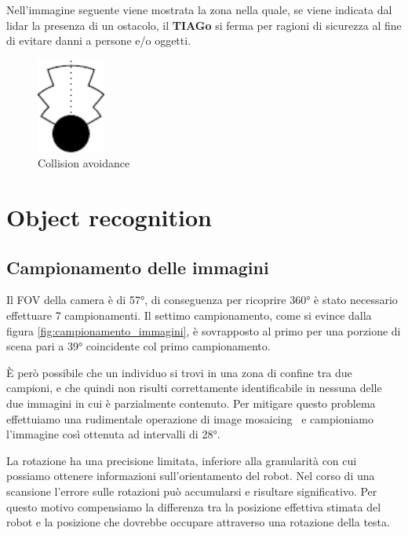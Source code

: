 \documentclass[a4paper]{article}
\begin{document}
	Nell'immagine seguente viene mostrata la zona nella quale, se viene indicata dal lidar la presenza di un ostacolo, il \textbf{TIAGo} si ferma per ragioni di sicurezza al fine di evitare danni a persone e/o oggetti.
	\begin{figure}[H]
		\centering
		\includegraphics[width=0.2\textwidth]{./img/collision_avoidance.pdf}
		\caption{Collision avoidance}
		\label{fig:collision_avoidance}
	\end{figure}
	
	\section{Object recognition}\label{sec:Object-recognition}
	
	\subsection{Campionamento delle immagini}\label{subsec:Campionamento-delle-immagini}
	Il FOV della camera è di 57°, di conseguenza per ricoprire 360° è stato
	necessario effettuare 7 campionamenti. Il settimo campionamento, come si
	evince dalla figura \ref{fig:campionamento_immagini}, è sovrapposto al
	primo per una porzione di scena pari a 39° coincidente col primo
	campionamento.

	È però possibile che un individuo si trovi in una zona di confine tra due
	campioni, e che quindi non risulti correttamente identificabile in nessuna
	delle due immagini in cui è parzialmente contenuto. Per mitigare questo
	problema effettuiamo una rudimentale operazione di image
	mosaicing~\cite{ghosh2016survey} e campioniamo l'immagine così ottenuta
	ad intervalli di 28°.
	
	La rotazione ha una precisione limitata, inferiore alla granularità con cui
	possiamo ottenere informazioni sull'orientamento del robot. Nel corso di
	una scansione l'errore sulle rotazioni può accumularsi e risultare
	significativo. Per questo motivo compensiamo la differenza tra la posizione
	effettiva stimata del robot e la posizione che dovrebbe occupare attraverso
	una rotazione della testa.
	
\end{document}

